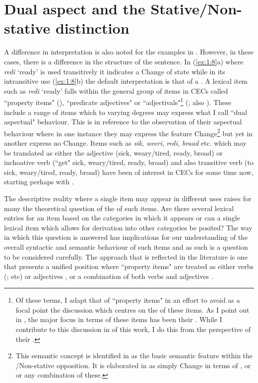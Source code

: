 \section{Dual aspect and the Stative/Non-stative distinction}\label{sec:1.6}

A difference in interpretation is also noted for the examples in .
However, in these cases, there is a difference in the structure of the sentence.
In (\ref{ex:1:8}a) where \textit{redi} `ready' is used transitively it indicates
a Change of state while in its intransitive use (\ref{ex:1:8}b) the default
interpretation is that of a .  A lexical item such as \textit{redi} `ready' falls
within the general group of items in CECs called ``property items"
(\citealt{Migge2000,Winford1993}), ``predicate adjectives" \citep{Seuren1986} or
``adjectivals"\footnote{Of these terms, I adapt that of ``property items" in an
  effort to avoid as a focal point the discussion which centres on the
   of these items.  As I point out in , the major
focus in terms of these items has been their . While I
contribute to this discussion in  of this work, I do this from the
perspective of their .} (\citealt{Kouwenberg1996}; also
\citealt{Sebba1986}).  These include a range of items which to varying degrees
may express what I call ``dual aspectual" behaviour.  This is in reference to the
observation of their aspectual behaviour where in one instance they may express
the feature Change\footnote{This semantic concept is identified in 
as the basic semantic feature within the \slash Non-stative opposition. It is
elaborated in  as simply Change in terms of \MOTION, \CHANGEOFSTATE 
or \CONTACT or any combination of these.} but yet in another express no
Change.  Items such as \textit{sik, weeri}, \textit{redi, braad} etc. which may
be translated as either the adjective (sick, weary\slash tired, ready, broad) or
inchoative verb (\BECOME ``get" sick, weary\slash tired, ready, broad) and also
transitive verb (\CAUSE to \BECOME sick, weary\slash tired, ready, broad) have been of
interest in CECs for some time now, starting perhaps with \citet{Voorhoeve1957}.

The descriptive reality where a single item may appear in different uses raises
for many the theoretical question of the  of such items.  Are
there several lexical entries for an item based on the categories in which it
appears or can a single lexical item which allows for derivation into other
categories be posited?  The way in which this question is answered has
implications for our understanding of the overall syntactic and semantic
behaviour of such items and as such is a question to be considered carefully.
The approach that is reflected in the literature is one that presents a unified
position where ``property items" are treated as either verbs
(\citealt{Alleyne1980,Jaganauth1987,Sebba1986,Winford1993}; etc) or adjectives
\citep{Seuren1986}, or a combination of both verbs and adjectives
\citep{Kouwenberg1996}.\largerpage[-4]

